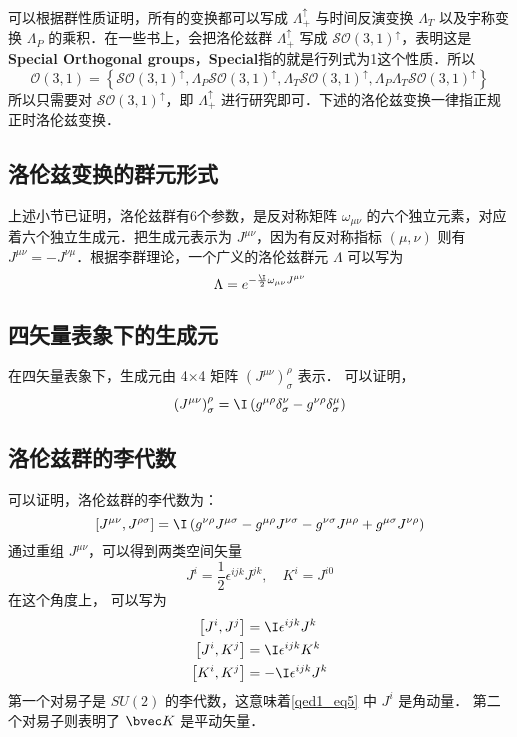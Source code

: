 可以根据群性质证明，所有的变换都可以写成 $\Lambda_{+}^{\uparrow}$ 与时间反演变换 $ \Lambda_{T}$ 以及宇称变换 $\Lambda_{P}$ 的乘积．在一些书上，会把洛伦兹群 $\Lambda_{+}^{\uparrow}$ 写成 $\mathcal{S O}(3,1)^{\uparrow}$，表明这是\textbf{Special Orthogonal groups}，\textbf{Special}指的就是行列式为1这个性质．所以$$\mathcal{O}(3,1)=\left\{\mathcal{S O}(3,1)^{\uparrow}, \Lambda_{P} \mathcal{S O}(3,1)^{\uparrow}, \Lambda_{T} \mathcal{S O}(3,1)^{\uparrow}, \Lambda_{P} \Lambda_{T} \mathcal{S O}(3,1)^{\uparrow}\right\}$$所以只需要对 $\mathcal{S O}(3,1)^{\uparrow}$，即 $\Lambda_{+}^{\uparrow}$ 进行研究即可．下述的洛伦兹变换一律指正规正时洛伦兹变换．

\subsection{洛伦兹变换的群元形式}
上述小节已证明，洛伦兹群有6个参数，是反对称矩阵 $\omega_{\mu\nu}$ 的六个独立元素，对应着六个独立生成元．把生成元表示为 $J^{\mu\nu}$，因为有反对称指标 $(\mu,\nu)$ 则有 $J^{\mu\nu}=-J^{\nu\mu}$．根据李群理论，一个广义的洛伦兹群元 $\Lambda$ 可以写为
\begin{equation}
\Lambda=e^{-\frac{\I}{2} \omega_{\mu\nu}J^{\mu\nu}}
\end{equation}

\subsection{四矢量表象下的生成元}
在四矢量表象下，生成元由 4×4 矩阵 $(J^{\mu\nu})_\sigma^\rho$ 表示．
可以证明，
\begin{equation}\left(J^{\mu \nu}\right)_{\sigma}^{\rho}=\I\left(g^{\mu \rho} \delta_{\sigma}^{\nu}-g^{\nu \rho} \delta_{\sigma}^{\mu}\right)\end{equation}
\subsection{洛伦兹群的李代数}
可以证明，洛伦兹群的李代数为：
\begin{equation}\left[J^{\mu \nu}, J^{\rho \sigma}\right]=\I\left(g^{\nu \rho} J^{\mu \sigma}-g^{\mu \rho} J^{\nu \sigma}-g^{\nu \sigma} J^{\mu \rho}+g^{\mu \sigma} J^{\nu \rho}\right)\end{equation}
通过重组 $J^{\mu\nu}$，可以得到两类空间矢量
\begin{equation}\label{qed1_eq5}J^{i}=\frac{1}{2} \epsilon^{i j k} J^{j k}, \quad K^{i}=J^{i 0}\end{equation}
在这个角度上， 可以写为
\begin{equation}\begin{aligned}
\left[J^{i}, J^{j}\right] &=\I \epsilon^{i j k} J^{k} \\
\left[J^{i}, K^{j}\right] &=\I \epsilon^{i j k} K^{k} \\
\left[K^{i}, K^{j}\right] &=-\I \epsilon^{i j k} J^{k}
\end{aligned}\end{equation}
第一个对易子是 $SU(2)$ 的李代数，这意味着\autoref{qed1_eq5} 中 $J^i$ 是角动量． 第二个对易子则表明了 $\bvec K$ 是平动矢量．
